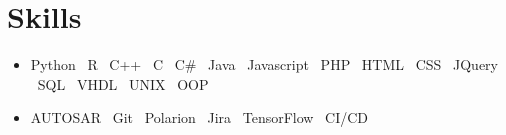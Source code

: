 \documentclass[letterpaper,11pt]{article}
\begin{document}
\section{Skills}
\begin{itemize}
    \item Python \textbar\ R \textbar\ C++ \textbar\ C \textbar\ C\# \textbar\ Java \textbar\ Javascript \textbar\ PHP \textbar\ HTML \textbar\ CSS \textbar\ JQuery \textbar\ SQL \textbar\ VHDL \textbar\ UNIX \textbar\ OOP
    \item AUTOSAR \textbar\ Git \textbar\ Polarion \textbar\ Jira \textbar\ TensorFlow \textbar\ CI/CD
\end{itemize}
\end{document}
